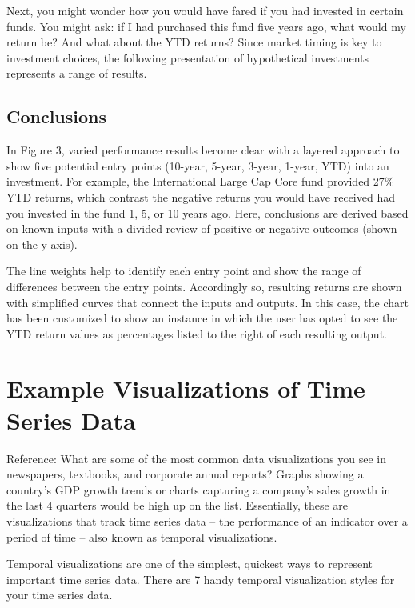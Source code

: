 \documentclass[]{book}
\theoremstyle{definition}
\theoremstyle{definition}
\theoremstyle{definition}
\theoremstyle{remark}
\begin{document}
Next, you might wonder how you would have fared if you had invested in
certain funds. You might ask: if I had purchased this fund five years
ago, what would my return be? And what about the YTD returns? Since
market timing is key to investment choices, the following presentation
of hypothetical investments represents a range of results.

\subsection{Conclusions}\label{conclusions}

In Figure 3, varied performance results become clear with a layered
approach to show five potential entry points (10-year, 5-year, 3-year,
1-year, YTD) into an investment. For example, the International Large
Cap Core fund provided 27\% YTD returns, which contrast the negative
returns you would have received had you invested in the fund 1, 5, or 10
years ago. Here, conclusions are derived based on known inputs with a
divided review of positive or negative outcomes (shown on the y-axis).

The line weights help to identify each entry point and show the range of
differences between the entry points. Accordingly so, resulting returns
are shown with simplified curves that connect the inputs and outputs. In
this case, the chart has been customized to show an instance in which
the user has opted to see the YTD return values as percentages listed to
the right of each resulting output.\citep{data_meaning}

\section{Example Visualizations of Time Series
Data}\label{example-visualizations-of-time-series-data}

Reference: \citep{aya-time-series} What are some of the most common data
visualizations you see in newspapers, textbooks, and corporate annual
reports? Graphs showing a country's GDP growth trends or charts
capturing a company's sales growth in the last 4 quarters would be high
up on the list. Essentially, these are visualizations that track time
series data -- the performance of an indicator over a period of time --
also known as temporal visualizations.

Temporal visualizations are one of the simplest, quickest ways to
represent important time series data. There are 7 handy temporal
visualization styles for your time series data.
\end{document}
